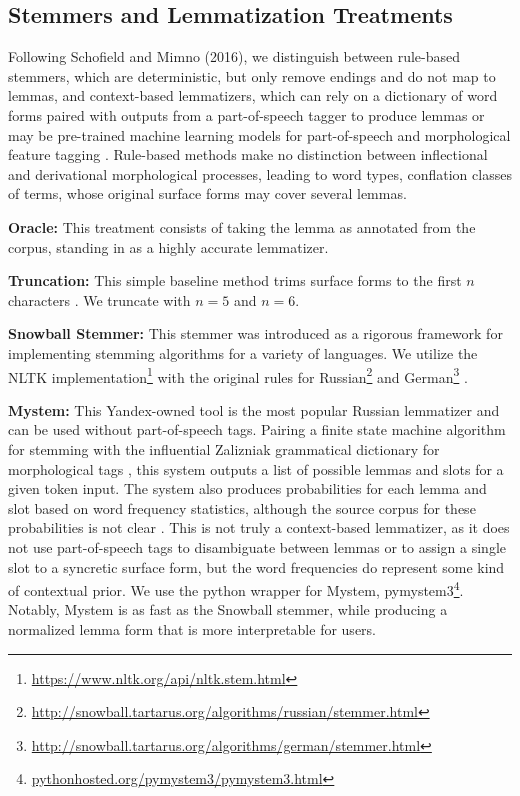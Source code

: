 \documentclass[11pt,a4paper]{article}
\begin{document}
\subsection{Stemmers and Lemmatization Treatments}
\label{sec:stemmers}
Following Schofield and Mimno (2016), we distinguish between rule-based stemmers, which are deterministic, but only remove endings and do not map to lemmas, and context-based lemmatizers, which can rely on a dictionary of word forms paired with outputs from a part-of-speech tagger to produce lemmas \cite{schofield-mimno-2016-comparing,Sharoff2011ThePP} or may be pre-trained machine learning models for part-of-speech and morphological feature tagging \cite{qi2020stanza}. Rule-based methods make no distinction between inflectional and derivational morphological processes, leading to word types, conflation classes of terms, whose original surface forms may cover several lemmas.

\textbf{Oracle:} This treatment consists of taking the lemma as annotated from the corpus, standing in as a highly accurate lemmatizer.

\textbf{Truncation:} This simple baseline method trims surface forms to the first $n$ characters \cite{schofield-mimno-2016-comparing}. We truncate with $n=5$ and $n=6$.

\textbf{Snowball Stemmer:} This stemmer was introduced as a rigorous framework for implementing stemming algorithms for a variety of languages. We utilize the NLTK implementation\footnote{\url{https://www.nltk.org/api/nltk.stem.html}} with the original rules for Russian\footnote{\url{http://snowball.tartarus.org/algorithms/russian/stemmer.html}} and German\footnote{\url{http://snowball.tartarus.org/algorithms/german/stemmer.html}} \cite{snowball}.


\textbf{Mystem:} This Yandex-owned tool is the most popular Russian lemmatizer and can be used without part-of-speech tags. Pairing a finite state machine algorithm for stemming with the influential Zalizniak grammatical dictionary for morphological tags \cite{zaliznyak1977}, this system outputs a list of possible lemmas and slots for a given token input. The system also produces probabilities for each lemma and slot based on word frequency statistics, although the source corpus for these probabilities is not clear \cite{Segalovich2003AFM}. This is not truly a context-based lemmatizer, as it does not use part-of-speech tags to disambiguate between lemmas or to assign a single slot to a syncretic surface form, but the word frequencies do represent some kind of contextual prior. We use the python wrapper for Mystem, pymystem3\footnote{\url{pythonhosted.org/pymystem3/pymystem3.html}}. Notably, Mystem is as fast as the Snowball stemmer, while producing a normalized lemma form that is more interpretable for users.
\end{document}

